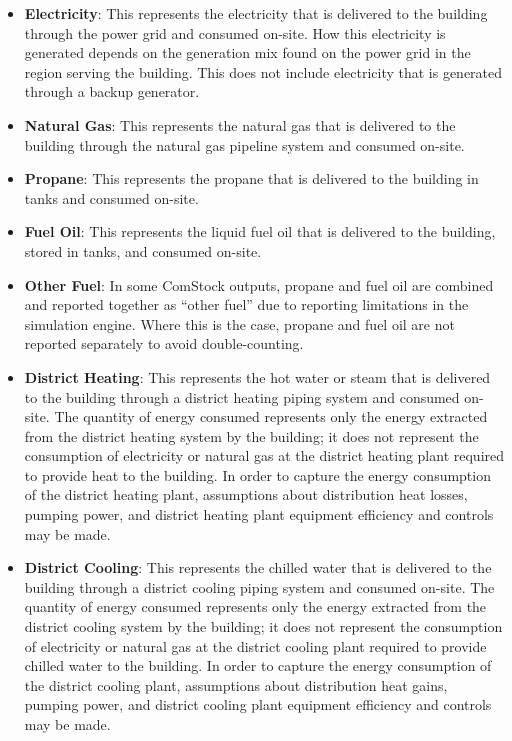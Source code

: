 \begin{itemize}
  \item \textbf{Electricity}: This represents the electricity that is delivered to the building through the power grid and consumed on-site. How this electricity is generated depends on the generation mix found on the power grid in the region serving the building. This does not include electricity that is generated through a backup generator.
  \item \textbf{Natural Gas}: This represents the natural gas that is delivered to the building through the natural gas pipeline system and consumed on-site.
  \item \textbf{Propane}: This represents the propane that is delivered to the building in tanks and consumed on-site.
  \item \textbf{Fuel Oil}: This represents the liquid fuel oil that is delivered to the building, stored in tanks, and consumed on-site.
  \item \textbf{Other Fuel}: In some ComStock outputs, propane and fuel oil are combined and reported together as ``other fuel'' due to reporting limitations in the simulation engine. Where this is the case, propane and fuel oil are not reported separately to avoid double-counting.
  \item \textbf{District Heating}: This represents the hot water or steam that is delivered to the building through a district heating piping system and consumed on-site. The quantity of energy consumed represents only the energy extracted from the district heating system by the building; it does not represent the consumption of electricity or natural gas at the district heating plant required to provide heat to the building. In order to capture the energy consumption of the district heating plant, assumptions about distribution heat losses, pumping power, and district heating plant equipment efficiency and controls may be made.
  \item \textbf{District Cooling}: This represents the chilled water that is delivered to the building through a district cooling piping system and consumed on-site. The quantity of energy consumed represents only the energy extracted from the district cooling system by the building; it does not represent the consumption of electricity or natural gas at the district cooling plant required to provide chilled water to the building. In order to capture the energy consumption of the district cooling plant, assumptions about distribution heat gains, pumping power, and district cooling plant equipment efficiency and controls may be made.
\end{itemize}


